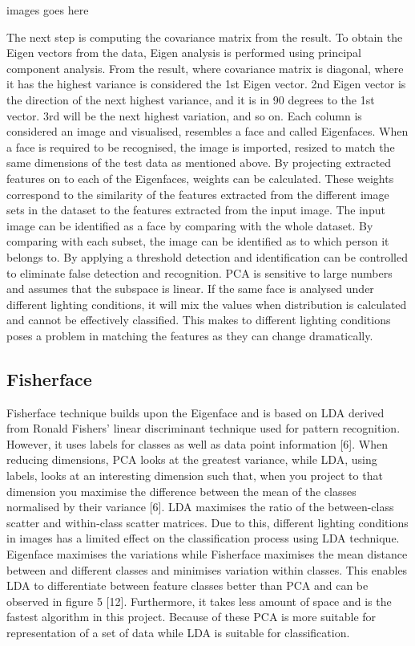 \documentclass[11pt]{article}
\begin{document}
images goes here

The next step is computing the covariance matrix from the result. To obtain the Eigen vectors from the
data, Eigen analysis is performed using principal component analysis. From the result, where covariance
matrix is diagonal, where it has the highest variance is considered the 1st Eigen vector. 2nd Eigen vector
is the direction of the next highest variance, and it is in 90 degrees to the 1st vector. 3rd will be the
next highest variation, and so on. Each column is considered an image and visualised, resembles a face
and called Eigenfaces. When a face is required to be recognised, the image is imported, resized to match
the same dimensions of the test data as mentioned above. By projecting extracted features on to each
of the Eigenfaces, weights can be calculated. These weights correspond to the similarity of the features
extracted from the different image sets in the dataset to the features extracted from the input image. The
input image can be identified as a face by comparing with the whole dataset. By comparing with each
subset, the image can be identified as to which person it belongs to. By applying a threshold detection
and identification can be controlled to eliminate false detection and recognition. PCA is sensitive to large
numbers and assumes that the subspace is linear. If the same face is analysed under different lighting
conditions, it will mix the values when distribution is calculated and cannot be effectively classified.
This makes to different lighting conditions poses a problem in matching the features as they can change
dramatically.
\subsection{Fisherface}
Fisherface technique builds upon the Eigenface and is based on LDA derived from Ronald Fishers’ linear
discriminant technique used for pattern recognition. However, it uses labels for classes as well as data
point information [6]. When reducing dimensions, PCA looks at the greatest variance, while LDA, using
labels, looks at an interesting dimension such that, when you project to that dimension you maximise
the difference between the mean of the classes normalised by their variance [6]. LDA maximises the ratio
of the between-class scatter and within-class scatter matrices. Due to this, different lighting conditions
in images has a limited effect on the classification process using LDA technique. Eigenface maximises
the variations while Fisherface maximises the mean distance between and different classes and minimises
variation within classes. This enables LDA to differentiate between feature classes better than PCA and
can be observed in figure 5 [12]. Furthermore, it takes less amount of space and is the fastest algorithm
in this project. Because of these PCA is more suitable for representation of a set of data while LDA is
suitable for classification.
\end{document}
